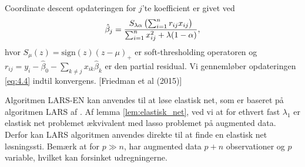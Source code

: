 Coordinate descent opdateringen for $j$'te koefficient er givet ved
\begin{align}
\hat{\beta}_j = \frac{S_{\lambda \alpha} \del{\sum_{i=1}^n r_{ij} x_{ij}}}{\sum_{i=1}^n x_{ij}^2 + \lambda (1-\alpha)}, \label{eq:4.4}
\end{align} 
hvor $S_\mu(z)=\text{sign}(z)(z-\mu)_+$ er soft-thresholding operatoren og $r_{ij}=y_i - \hat{\beta}_0 - \sum_{k \neq j} x_{ik} \hat{\beta}_k$ er den partial residual.
Vi gennemløber opdateringen \eqref{eq:4.4} indtil konvergens.
[Friedman et al (2015)]

Algoritmen LARS-EN kan anvendes til at løse elastisk net, som er baseret på algoritmen LARS af \cite{efron}.
Af lemma \ref{lem:elastisk_net}, ved vi at for ethvert fast \(\lambda_1\) er elastisk net problemet ækvivalent med lasso problemet på augmented data.
Derfor kan LARS algoritmen anvendes direkte til at finde en elastisk net løsningssti.
Bemærk at for \(p \gg n\), har augmented data \(p+n\) observationer og \(p\) variable, hvilket kan forsinket udregningerne.


